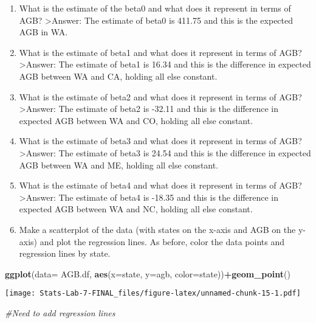 \documentclass[
]{article}
\newenvironment{Shaded}{\begin{snugshade}}{\end{snugshade}}
\newcommand{\AttributeTok}[1]{\textcolor[rgb]{0.13,0.29,0.53}{#1}}
\newcommand{\CommentTok}[1]{\textcolor[rgb]{0.56,0.35,0.01}{\textit{#1}}}
\newcommand{\FunctionTok}[1]{\textcolor[rgb]{0.13,0.29,0.53}{\textbf{#1}}}
\newcommand{\NormalTok}[1]{#1}
\newcommand{\SpecialCharTok}[1]{\textcolor[rgb]{0.81,0.36,0.00}{\textbf{#1}}}
\begin{document}
\begin{enumerate}
\def\labelenumi{\alph{enumi}.}
\item
  What is the estimate of the beta0 and what does it represent in terms
  of AGB? \textgreater Answer: The estimate of beta0 is 411.75 and this
  is the expected AGB in WA.
\item
  What is the estimate of beta1 and what does it represent in terms of
  AGB? \textgreater Answer: The estimate of beta1 is 16.34 and this is
  the difference in expected AGB between WA and CA, holding all else
  constant.
\item
  What is the estimate of beta2 and what does it represent in terms of
  AGB? \textgreater Answer: The estimate of beta2 is -32.11 and this is
  the difference in expected AGB between WA and CO, holding all else
  constant.
\item
  What is the estimate of beta3 and what does it represent in terms of
  AGB? \textgreater Answer: The estimate of beta3 is 24.54 and this is
  the difference in expected AGB between WA and ME, holding all else
  constant.
\item
  What is the estimate of beta4 and what does it represent in terms of
  AGB? \textgreater Answer: The estimate of beta4 is -18.35 and this is
  the difference in expected AGB between WA and NC, holding all else
  constant.
\item
  Make a scatterplot of the data (with states on the x-axis and AGB on
  the y-axis) and plot the regression lines. As before, color the data
  points and regression lines by state.
\end{enumerate}

\begin{Shaded}
\begin{Highlighting}[]
\FunctionTok{ggplot}\NormalTok{(}\AttributeTok{data=}\NormalTok{ AGB.df, }\FunctionTok{aes}\NormalTok{(}\AttributeTok{x=}\NormalTok{state, }\AttributeTok{y=}\NormalTok{agb, }\AttributeTok{color=}\NormalTok{state))}\SpecialCharTok{+}\FunctionTok{geom\_point}\NormalTok{()}
\end{Highlighting}
\end{Shaded}

\texttt{[image: Stats-Lab-7-FINAL\_files/figure-latex/unnamed-chunk-15-1.pdf]}

\begin{Shaded}
\begin{Highlighting}[]
\CommentTok{\#Need to add regression lines}
\end{Highlighting}
\end{Shaded}
\end{document}
